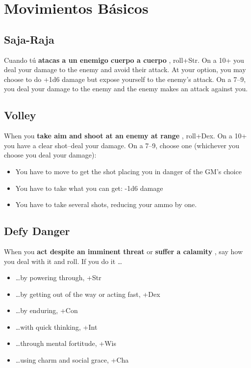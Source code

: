 \section*{Movimientos Básicos}
\subsection{Saja-Raja}


 Cuando tú \textbf{atacas a un enemigo cuerpo a cuerpo}
, roll+Str. On a 10+ you deal your damage to the enemy and avoid their attack. At your option, you may choose to do +1d6 damage but expose yourself to the enemy's attack. On a 7--9, you deal your damage to the enemy and the enemy makes an attack against you.
\subsection{Volley}


 When you \textbf{take aim and shoot at an enemy at range}
, roll+Dex. On a 10+ you have a clear shot--deal your damage. On a 7--9, choose one (whichever you choose you deal your damage):
\begin{itemize}
\item You have to move to get the shot placing you in danger of the GM's choice
\item You have to take what you can get: -1d6 damage
\item You have to take several shots, reducing your ammo by one.

\end{itemize}
\subsection{Defy Danger}


 When you \textbf{act despite an imminent threat}
 or \textbf{suffer a calamity}
, say how you deal with it and roll. If you do it \ldots 
\begin{itemize}
\item  \ldots by powering through, +Str
\item  \ldots by getting out of the way or acting fast, +Dex
\item  \ldots by enduring, +Con
\item  \ldots with quick thinking, +Int
\item  \ldots through mental fortitude, +Wis
\item  \ldots using charm and social grace, +Cha

\end{itemize}


